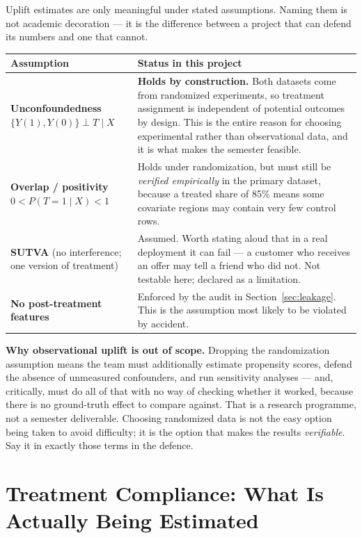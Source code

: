 \documentclass[11pt,a4paper]{article}
\begin{document}
Uplift estimates are only meaningful under stated assumptions. Naming them is not academic
decoration --- it is the difference between a project that can defend its numbers and one that
cannot.

\begin{tabularx}{\textwidth}{@{}L{4.0cm}X@{}}
\toprule
\textbf{Assumption} & \textbf{Status in this project} \\
\midrule
\textbf{Unconfoundedness} \newline $\{Y(1),Y(0)\} \perp T \mid X$ &
\textbf{Holds by construction.} Both datasets come from randomized experiments, so treatment
assignment is independent of potential outcomes by design. This is the entire reason for choosing
experimental rather than observational data, and it is what makes the semester feasible. \\
\textbf{Overlap / positivity} \newline $0 < P(T{=}1\mid X) < 1$ &
Holds under randomization, but must still be \emph{verified empirically} in the primary dataset,
because a treated share of 85\% means some covariate regions may contain very few control rows. \\
\textbf{SUTVA} (no interference; one version of treatment) &
Assumed. Worth stating aloud that in a real deployment it can fail --- a customer who receives an
offer may tell a friend who did not. Not testable here; declared as a limitation. \\
\textbf{No post-treatment features} &
Enforced by the audit in Section~\ref{sec:leakage}. This is the assumption most likely to be
violated by accident. \\
\bottomrule
\end{tabularx}

\begin{alertbox}
\textbf{Why observational uplift is out of scope.} Dropping the randomization assumption means
the team must additionally estimate propensity scores, defend the absence of unmeasured
confounders, and run sensitivity analyses --- and, critically, must do all of that with no way of
checking whether it worked, because there is no ground-truth effect to compare against. That is a
research programme, not a semester deliverable. Choosing randomized data is not the easy option
being taken to avoid difficulty; it is the option that makes the results \emph{verifiable}. Say it
in exactly those terms in the defence.
\end{alertbox}

\section{Treatment Compliance: What Is Actually Being Estimated}
\label{sec:itt}
\end{document}
